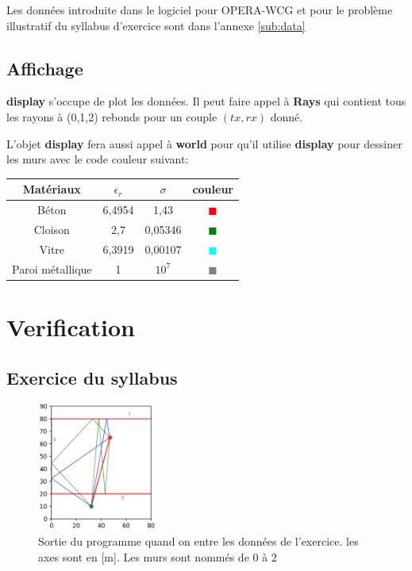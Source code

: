 \documentclass[sn-mathphys-num]{sn-jnl}%
\theoremstyle{thmstyleone}%
\theoremstyle{thmstyletwo}%
\theoremstyle{thmstylethree}%
\begin{document}
Les données introduite dans le logiciel pour OPERA-WCG et pour le problème illustratif
du syllabus d'exercice sont dans l'annexe \ref{sub:data}

\subsection{Affichage}
\textbf{display} s'occupe de plot les données. Il peut faire appel à \textbf{Rays}
qui contient tous les rayons à (0,1,2) rebonds pour un couple $(tx,rx)$ donné.

L'objet \textbf{display} fera aussi appel à \textbf{world} pour qu'il utilise \textbf{display}
pour dessiner les murs avec le code couleur suivant:
\begin{table}[H]
    \centering
    
\begin{tabular}{|c|c|c|c|} 
    \toprule
    Matériaux & $\epsilon_r$ & $\sigma$ & couleur \\
    \midrule
    Béton & 6,4954 & 1,43 & \textcolor{red}{$\blacksquare$}\\
    \midrule
    Cloison & 2,7 & 0,05346 & \textcolor{green}{$\blacksquare$}\\
    \midrule
    Vitre & 6,3919 & 0,00107 & \textcolor{cyan}{$\blacksquare$}\\
    \midrule
    Paroi métallique  & 1 & $10^7$ & \textcolor{gray}{$\blacksquare$} \\
    \bottomrule
\end{tabular}

\end{table}





\section{Verification}

\subsection{Exercice du syllabus}
\begin{figure}[H]
    \centering
    \includegraphics[width=0.35\textwidth]{images/verif/rayons.png}
    \caption{Sortie du programme quand on entre les données de l'exercice. les axes sont en [m]. Les murs sont nommés de 0 à 2}
    \label{f:ray_ex}
\end{figure}
\end{document}

